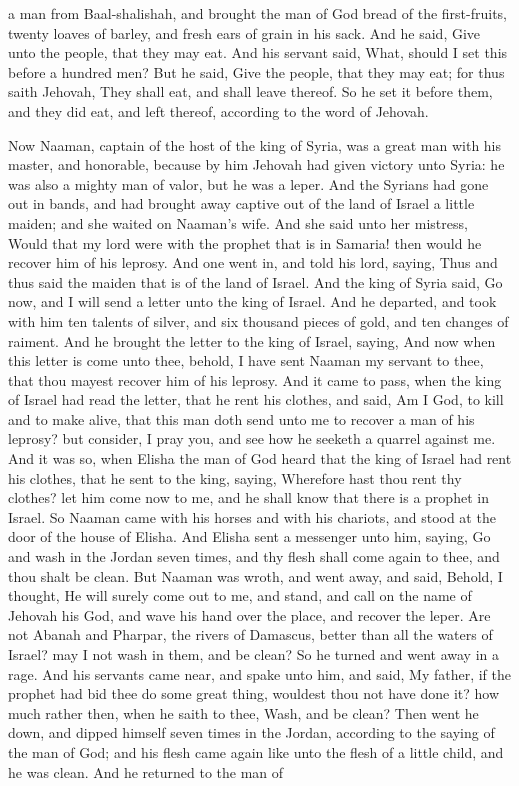 a man from Baal-shalishah, and brought the man of God bread of the first-fruits, twenty loaves of barley, and fresh ears of grain in his sack. And he said, Give unto the people, that they may eat. And his servant said, What, should I set this before a hundred men? But he said, Give the people, that they may eat; for thus saith Jehovah, They shall eat, and shall leave thereof. So he set it before them, and they did eat, and left thereof, according to the word of Jehovah. 

Now Naaman, captain of the host of the king of Syria, was a great man with his master, and honorable, because by him Jehovah had given victory unto Syria: he was also a mighty man of valor, but he was a leper. And the Syrians had gone out in bands, and had brought away captive out of the land of Israel a little maiden; and she waited on Naaman’s wife. And she said unto her mistress, Would that my lord were with the prophet that is in Samaria! then would he recover him of his leprosy. And one went in, and told his lord, saying, Thus and thus said the maiden that is of the land of Israel. And the king of Syria said, Go now, and I will send a letter unto the king of Israel. And he departed, and took with him ten talents of silver, and six thousand pieces of gold, and ten changes of raiment. And he brought the letter to the king of Israel, saying, And now when this letter is come unto thee, behold, I have sent Naaman my servant to thee, that thou mayest recover him of his leprosy. And it came to pass, when the king of Israel had read the letter, that he rent his clothes, and said, Am I God, to kill and to make alive, that this man doth send unto me to recover a man of his leprosy? but consider, I pray you, and see how he seeketh a quarrel against me.  And it was so, when Elisha the man of God heard that the king of Israel had rent his clothes, that he sent to the king, saying, Wherefore hast thou rent thy clothes? let him come now to me, and he shall know that there is a prophet in Israel. So Naaman came with his horses and with his chariots, and stood at the door of the house of Elisha. And Elisha sent a messenger unto him, saying, Go and wash in the Jordan seven times, and thy flesh shall come again to thee, and thou shalt be clean. But Naaman was wroth, and went away, and said, Behold, I thought, He will surely come out to me, and stand, and call on the name of Jehovah his God, and wave his hand over the place, and recover the leper. Are not Abanah and Pharpar, the rivers of Damascus, better than all the waters of Israel? may I not wash in them, and be clean? So he turned and went away in a rage. And his servants came near, and spake unto him, and said, My father, if the prophet had bid thee do some great thing, wouldest thou not have done it? how much rather then, when he saith to thee, Wash, and be clean? Then went he down, and dipped himself seven times in the Jordan, according to the saying of the man of God; and his flesh came again like unto the flesh of a little child, and he was clean.  And he returned to the man of 
